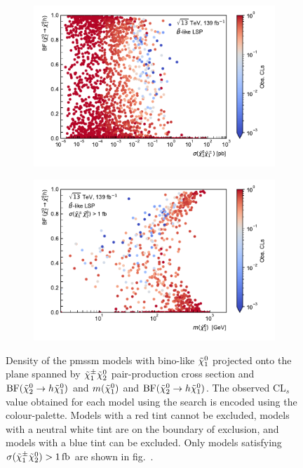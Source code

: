 \begin{figure}
	\centering
	\begin{subfigure}[b]{0.5\linewidth}
		\centering\includegraphics[width=\textwidth]{scatter/fig_scatter_xsec_BFHiggs_bino}
		\caption{\label{fig:fig_scatter_xsec_BFHiggs_bino}}
	\end{subfigure}\hfill
	\begin{subfigure}[b]{0.5\linewidth}
		\centering\includegraphics[width=\textwidth]{scatter/fig_scatter_mchi10_BFHiggs_bino_withXsecCut}
		\caption{\label{fig:fig_scatter_mchi10_BFHiggs_bino_withXsecCut}}
	\end{subfigure}\hfill
	\caption{Density of the \gls{pmssm} models with bino-like $\tilde{\chi}_1^0$ projected onto the plane spanned by  $\tilde{\chi}_1^\pm\tilde{\chi}_2^0$ pair-production cross section and $\mathrm{BF}(\tilde{\chi}_2^0 \rightarrow h \tilde{\chi}_1^0)$ and  $m(\tilde{\chi}_1^0)$ and $\mathrm{BF}(\tilde{\chi}_2^0 \rightarrow h \tilde{\chi}_1^0)$. The observed CL$_s$ value obtained for each model using the \onelepton search is encoded using the colour-palette. Models with a red tint cannot be excluded, models with a neutral white tint are on the boundary of exclusion, and models with a blue tint can be excluded. Only models satisfying $\sigma(\charg\neutr)>\SI{1}{\femto\barn}$ are shown in fig.~.}
	\label{fig:bino_sensitivity}
\end{figure}

